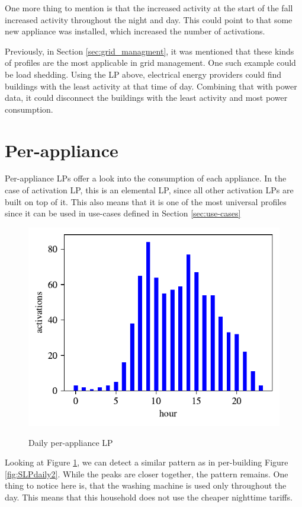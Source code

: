 One more thing to mention is that the increased activity at the start of the fall increased activity throughout the night and day.
This could point to that some new appliance was installed, which increased the number of activations.

Previously, in Section \ref{sec:grid_managment}, it was mentioned that these kinds of profiles are the most applicable in grid management. 
One such example could be load shedding.
Using the LP above, electrical energy providers could find buildings with the least activity at that time of day.
Combining that with power data, it could disconnect the buildings with the least activity and most power consumption.

\section{Per-appliance}

Per-appliance LPs offer a look into the consumption of each appliance. 
In the case of activation LP, this is an elemental LP, since all other activation LPs are built on top of it. 
This also means that it is one of the most universal profiles since it can be used in use-cases defined in Section \ref{sec:use-cases}

\begin{figure}[H]
	\centering
	\caption{Daily per-appliance LP}
	\includegraphics[]{../Figures/LPS/WM_daily.pdf}
	\label{fig:WM_daily}
\end{figure}

Looking at Figure \ref{fig:WM_daily}, we can detect a similar pattern as in per-building Figure \ref{fig:SLPdaily2}. 
While the peaks are closer together, the pattern remains.
One thing to notice here is, that the washing machine is used only throughout the day.
This means that this household does not use the cheaper nighttime tariffs.


